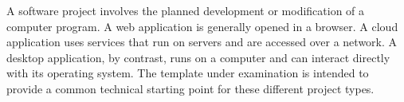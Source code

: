 \begin{beginnerstatement}

A software project involves the planned development or modification of a
computer program. A web application is generally opened in a browser. A cloud
application uses services that run on servers and are accessed over a network.
A desktop application, by contrast, runs on a computer and can interact
directly with its operating system. The template under examination is intended
to provide a common technical starting point for these different project types.

\end{beginnerstatement}
